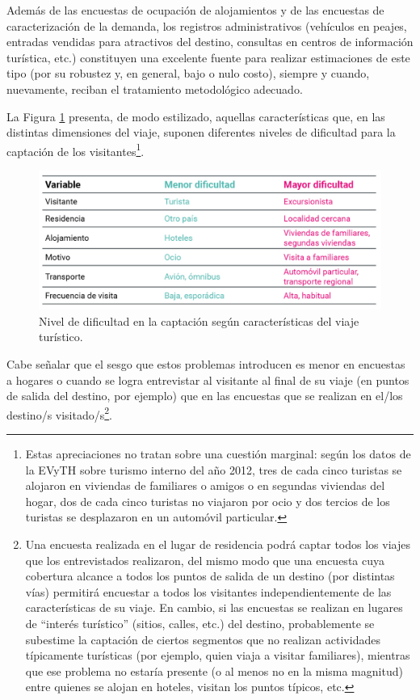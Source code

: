 \documentclass[
]{book}
\begin{document}
Además de las encuestas de ocupación de alojamientos y de las encuestas de caracterización de la demanda, los registros administrativos (vehículos en peajes, entradas vendidas para atractivos del destino, consultas en centros de información turística, etc.) constituyen una excelente fuente para realizar estimaciones de este tipo (por su robustez y, en general, bajo o nulo costo), siempre y cuando, nuevamente, reciban el tratamiento metodológico adecuado.

La Figura \ref{fig:dificultad} presenta, de modo estilizado, aquellas características que, en las distintas dimensiones del viaje, suponen diferentes niveles de dificultad para la captación de los visitantes\footnote{Estas apreciaciones no tratan sobre una cuestión marginal: según los datos de la EVyTH sobre turismo interno del año 2012, tres de cada cinco turistas se alojaron en viviendas de familiares o amigos o en segundas viviendas del hogar, dos de cada cinco turistas no viajaron por ocio y dos tercios de los turistas se desplazaron en un automóvil particular.}.

\begin{figure}

{\centering \includegraphics[width=0.8\linewidth]{imagenes/figura1.4} 

}

\caption{Nivel de dificultad en la captación según características del viaje turístico.}\label{fig:dificultad}
\end{figure}

Cabe señalar que el sesgo que estos problemas introducen es menor en encuestas a hogares o cuando se logra entrevistar al visitante al final de su viaje (en puntos de salida del destino, por ejemplo) que en las encuestas que se realizan en el/los destino/s visitado/s\footnote{Una encuesta realizada en el lugar de residencia podrá captar todos los viajes que los entrevistados realizaron, del mismo modo que una encuesta cuya cobertura alcance a todos los puntos de salida de un destino (por distintas vías) permitirá encuestar a todos los visitantes independientemente de las características de su viaje. En cambio, si las encuestas se realizan en lugares de ``interés turístico'' (sitios, calles, etc.) del destino, probablemente se subestime la captación de ciertos segmentos que no realizan actividades típicamente turísticas (por ejemplo, quien viaja a visitar familiares), mientras que ese problema no estaría presente (o al menos no en la misma magnitud) entre quienes se alojan en hoteles, visitan los puntos típicos, etc.}.
\end{document}

